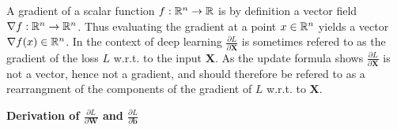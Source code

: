\documentclass{article}
\begin{document}
\vspace{0.3cm}
A gradient of a scalar function \(f : \mathbb{R}^{n} \rightarrow \mathbb{R}\) is by definition a vector
field \(\nabla f : \mathbb{R}^{n} \rightarrow \mathbb{R}^{n}\). Thus evaluating the gradient at a point
\(x \in \mathbb{R}^{n}\) yields a vector \(\nabla f(x) \in \mathbb{R}^{n}\). In the context of deep learning
\(\frac{\partial L}{\partial \mathbf{X}}\) is sometimes refered to as the gradient of the 
loss \(L\) w.r.t. to the input \(\mathbf{X}\). As the update formula shows
\(\frac{\partial L}{\partial \mathbf{X}}\) is not a vector, hence not a gradient, and 
should therefore be refered to as a rearrangment of the components of the gradient of 
\(L\) w.r.t. to \(\mathbf{X}\). 

\vspace{0.3cm}
\noindent \large \textbf{Derivation of \(\frac{\partial L}{\partial \mathbf{W}}\) and 
\(\frac{\partial L}{\partial \mathbf{b}}\)}
\vspace{0.3cm}
\normalsize
\end{document}
